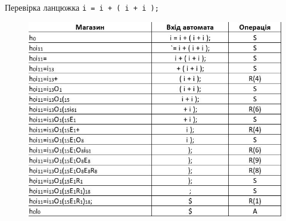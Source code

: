 \clearpage
Перевірка ланцюжка \verb|i = i + ( i + i );|
\begin{figure}[h!]
  \centering
  \includegraphics[width=16cm]{reports/formals/assets/pr3.jpeg}
\end{figure}












